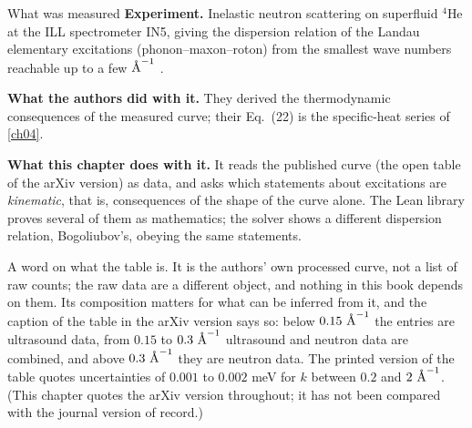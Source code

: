 \begin{godfrinbox}{What was measured}
\textbf{Experiment.} Inelastic neutron scattering on superfluid $^4$He at the ILL spectrometer IN5, giving the dispersion relation of the Landau elementary excitations (phonon--maxon--roton) from the smallest wave numbers reachable up to a few $\text{\AA}^{-1}$ \cite{Godfrin2021}.\par\vspace{2pt}
\textbf{What the authors did with it.} They derived the thermodynamic consequences of the measured curve; their Eq.~(22) is the specific-heat series of \cref{ch04}.\par\vspace{2pt}
\textbf{What this chapter does with it.} It reads the published curve (the open table of the arXiv version) as data, and asks which statements about excitations are \emph{kinematic}, that is, consequences of the shape of the curve alone. The Lean library proves several of them as mathematics; the solver shows a different dispersion relation, Bogoliubov's, obeying the same statements.
\end{godfrinbox}

A word on what the table is.
It is the authors' own processed curve, not a list of raw counts; the raw data are a different object, and nothing in this book depends on them.
Its composition matters for what can be inferred from it, and the caption of the table in the arXiv version says so: below $0.15\ \cfiveAng^{-1}$ the entries are ultrasound data, from $0.15$ to $0.3\ \cfiveAng^{-1}$ ultrasound and neutron data are combined, and above $0.3\ \cfiveAng^{-1}$ they are neutron data.
The printed version of the table quotes uncertainties of $0.001$ to $0.002$ meV for $k$ between $0.2$ and $2\ \text{\AA}^{-1}$.
(This chapter quotes the arXiv version throughout; it has not been compared with the journal version of record.)

